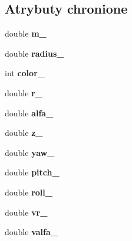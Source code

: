 \subsection*{Atrybuty chronione}
\begin{DoxyCompactItemize}
\item 
double {\bfseries m\+\_\+}\hypertarget{class_orb_af831efd6e6975007b7e7d49ce169eb1f}{}\label{class_orb_af831efd6e6975007b7e7d49ce169eb1f}

\item 
double {\bfseries radius\+\_\+}\hypertarget{class_orb_a8668fe8396d42e4eff952a0a340751cc}{}\label{class_orb_a8668fe8396d42e4eff952a0a340751cc}

\item 
int {\bfseries color\+\_\+}\hypertarget{class_orb_a711114d896e38b7627ddfc6c0ba0666a}{}\label{class_orb_a711114d896e38b7627ddfc6c0ba0666a}

\item 
double {\bfseries r\+\_\+}\hypertarget{class_orb_a6bda794dbd4c9f17b245cab3c287fe15}{}\label{class_orb_a6bda794dbd4c9f17b245cab3c287fe15}

\item 
double {\bfseries alfa\+\_\+}\hypertarget{class_orb_a15cdeb4a8dfd011ba311ccd3b95111bd}{}\label{class_orb_a15cdeb4a8dfd011ba311ccd3b95111bd}

\item 
double {\bfseries z\+\_\+}\hypertarget{class_orb_a3e83499b11c245a656f0fcbf6eb4c538}{}\label{class_orb_a3e83499b11c245a656f0fcbf6eb4c538}

\item 
double {\bfseries yaw\+\_\+}\hypertarget{class_orb_ab9d65b2a65d5a507edd440fe37171523}{}\label{class_orb_ab9d65b2a65d5a507edd440fe37171523}

\item 
double {\bfseries pitch\+\_\+}\hypertarget{class_orb_a06d9775e124b0cd6f7d3a70f4aafdb5a}{}\label{class_orb_a06d9775e124b0cd6f7d3a70f4aafdb5a}

\item 
double {\bfseries roll\+\_\+}\hypertarget{class_orb_a17b20eaacba3073347c91e63186c5acf}{}\label{class_orb_a17b20eaacba3073347c91e63186c5acf}

\item 
double {\bfseries vr\+\_\+}\hypertarget{class_orb_a92482a1423a5f50ad5cd88a0126c2261}{}\label{class_orb_a92482a1423a5f50ad5cd88a0126c2261}

\item 
double {\bfseries valfa\+\_\+}\hypertarget{class_orb_ad21a6b350baf08f2a0674f7f370abbed}{}\label{class_orb_ad21a6b350baf08f2a0674f7f370abbed}


\end{DoxyCompactItemize}
